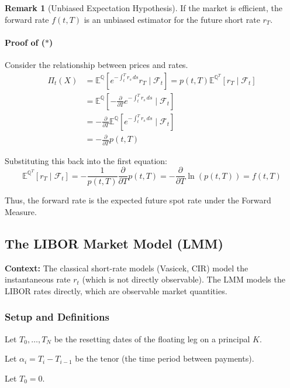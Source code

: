 \documentclass[12pt,a4paper]{article}
\theoremstyle{definition}
\newtheorem{remark}{Remark}[section]
\newcommand{\Q}{\mathbb{Q}}
\newcommand{\E}{\mathbb{E}}
\begin{document}
\begin{remark}[Unbiased Expectation Hypothesis]
If the market is efficient, the forward rate $f(t,T)$ is an unbiased estimator for the future short rate $r_T$.
\end{remark}

\paragraph{Proof of ($*$)}

Consider the relationship between prices and rates.
\[
\begin{aligned}
\Pi_t(X) &= \E^{\Q}\left[e^{-\int_t^T r_s \, ds} r_T \mid \mathcal{F}_t\right] = p(t,T)\E^{\Q^T}[r_T \mid \mathcal{F}_t] \\
&= \E^{\Q}\left[-\frac{\partial}{\partial T}e^{-\int_t^T r_s \, ds} \mid \mathcal{F}_t\right] \\
&= -\frac{\partial}{\partial T}\E^{\Q}\left[e^{-\int_t^T r_s \, ds} \mid \mathcal{F}_t\right] \\
&= -\frac{\partial}{\partial T}p(t,T)
\end{aligned}
\]

Substituting this back into the first equation:
\[
\E^{\Q^T}[r_T \mid \mathcal{F}_t] = -\frac{1}{p(t,T)}\frac{\partial}{\partial T}p(t,T) = -\frac{\partial}{\partial T}\ln(p(t,T)) = f(t,T)
\]

Thus, the forward rate is the expected future spot rate under the Forward Measure.

\subsection{The LIBOR Market Model (LMM)}

\textbf{Context:} The classical short-rate models (Vasicek, CIR) model the instantaneous rate $r_t$ (which is not directly observable). The LMM models the LIBOR rates directly, which are observable market quantities.

\subsubsection{Setup and Definitions}

Let $T_0, \ldots, T_N$ be the resetting dates of the floating leg on a principal $K$.

Let $\alpha_i = T_i - T_{i-1}$ be the tenor (the time period between payments).

Let $T_0 = 0$.
\end{document}
